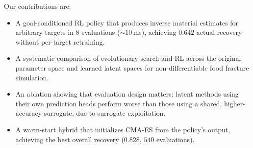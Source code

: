 
Our contributions are:
\begin{itemize}
    \item A goal-conditioned RL policy that produces inverse material estimates for arbitrary targets in $8$ evaluations (${\sim}10$\,ms), achieving $0.642$ actual recovery without per-target retraining.
    \item A systematic comparison of evolutionary search and RL across the original parameter space and learned latent spaces for non-differentiable food fracture simulation.
    \item An ablation showing that evaluation design matters: latent methods using their own prediction heads perform worse than those using a shared, higher-accuracy surrogate, due to surrogate exploitation.
    \item A warm-start hybrid that initializes CMA-ES from the policy's output, achieving the best overall recovery ($0.828$, $540$ evaluations).
\end{itemize}

